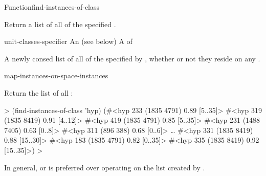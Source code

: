 \documentclass[10pt,twoside,english,pdftex]{article}
\begin{document}
\begin{functiondoc}{Function}{find-instances-of-class}%
  {
    \returns{} }
%
%
%

\fnsyntax

\fnpurpose Return a list of all  of the
specified .

\fnpackage {}

\fnmodule {}

\fnargs
\begin{args}{unit-classes-specifier}
 An 
(see below)
 A  of 
\end{args}

\fnreturns
{}%
%
A newly consed list of all  of the
 specified by ,
whether or not they reside on any .

\fndsyntax
\W\supp\tabletop
\unitclassesspec
\subclassingspec

\begin{alsos}{map-instances-on-space-instances}
\end{alsos}

\fnexample
Return the list of all  :
%
\W\supp
\begin{example}
  > (find-instances-of-class 'hyp)
  (#<hyp 233 (1835 4791) 0.89 [5..35]>
   #<hyp 319 (1835 8419) 0.91 [4..12]>
   #<hyp 419 (1835 4791) 0.85 [5..35]>
   #<hyp 231 (1488 7405) 0.63 [0..8]>
   #<hyp 311 (896 388) 0.68 [0..6]> 
     \textrm{\ldots{}}
   #<hyp 331 (1835 8419) 0.88 [15..30]>
   #<hyp 183 (1835 4791) 0.82 [0..35]>
   #<hyp 335 (1835 8419) 0.92 [15..35]>)
  >
\end{example} 

\fnnote In general,  or
 is preferred over operating
on the list created by .

\end{functiondoc}
\end{document}
